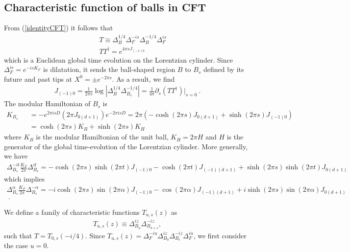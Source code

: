 \documentclass[a4paper,11pt]{article}
\theoremstyle{definition}
\newcommand{\nn}{\nonumber}
\newcommand{\p}{\partial}
\begin{document}
\subsection{Characteristic function of balls in CFT}
From (\ref{identityCFT}) it follows that 
\begin{eqnarray}
    &&T\equiv\Delta_B^{1/4}\Delta_F^{-is}\Delta_B^{-1/4}\Delta_F^{is}\nn\\
    &&T T^\dagger =  e^{4\pi sJ_{(-1)0}}
\end{eqnarray}
which is a Euclidean global time evolution on the Lorentzian cylinder. Since $\Delta_F^{is}=e^{- i s K_F}$ is dilatation, it sends the ball-shaped region $B$ to $B_s$ defined by its future and past tips at $X^0=\pm e^{-2\pi s}$. As a result, we find
\begin{eqnarray}
    J_{(-1)0}=\frac{1}{2\pi s}\log|\Delta_B^{1/4}\Delta_{B_s}^{-1/4}| = \frac{1}{4\pi}\p_s(TT^\dagger)\Big|_{s=0}\ .
\end{eqnarray}
The modular Hamiltonian of $B_s$ is 
\begin{eqnarray}\label{KBs}
    K_{B_s}&&=-e^{2\pi i s D}(2\pi J_{0(d+1)})e^{-2\pi i s D}= 2\pi (-\cosh(2\pi s)J_{0(d+1)}+\sinh(2\pi s)J_{(-1)0})\nn\\
    &&=\cosh(2\pi s) K_B+\sinh(2\pi s)K_H
\end{eqnarray}
where $K_B$ is the modular Hamiltonian of the unit ball, $K_H = 2\pi H$ and $H$ is the generator of the global time-evolution of the Lorentzian cylinder.
More generally, we have
\begin{eqnarray}
    \Delta_{B_s}^{-it}\frac{K_F}{2\pi}\Delta_{B_s}^{it}=-\cosh(2\pi s)\sinh(2\pi t)J_{(-1)0}-\cosh(2\pi t)J_{(-1)(d+1)}+\sinh(2\pi s)\sinh(2\pi t)J_{0(d+1)}\nn
\end{eqnarray}
which implies
\begin{eqnarray}
    \Delta_{B_s}^{\alpha}\frac{K_F}{2\pi}\Delta_{B_s}^{-\alpha}=-i\cosh(2\pi s)\sin(2\pi \alpha)J_{(-1)0}-\cos(2\pi \alpha)J_{(-1)(d+1)}+i\sinh(2\pi s)\sin(2\pi \alpha)J_{0(d+1)}\nn\\
    \ .
\end{eqnarray}

We define a family of characteristic functions $T_{u,s}(z)$ as 
\begin{align}
    T_{u,s}(z) \equiv \Delta_{B_u}^{iz}\Delta_{B_{u+s}}^{-iz},
\end{align}
such that $T = T_{0,s}(-i/4)$. Since $T_{u,s}(z) =  \Delta_F^{-iu}\Delta_{B_0}^{iz}\Delta_{B_s}^{-iz} \Delta_F^{iu}$, we first consider the case $u=0$.
\end{document}
